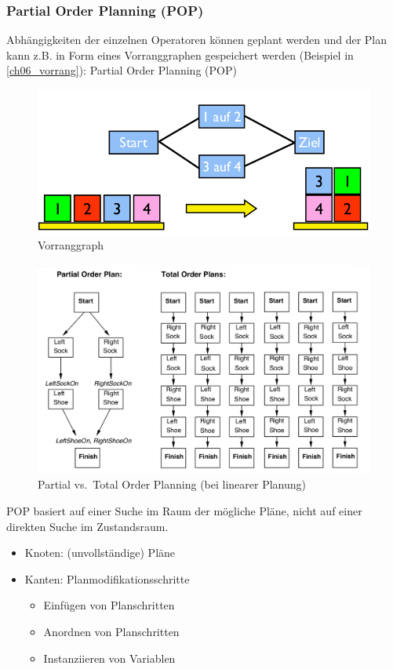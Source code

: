 \subsubsection{Partial Order Planning (POP)}
Abhängigkeiten der einzelnen Operatoren können geplant werden und der Plan kann z.B. in Form eines Vorranggraphen gespeichert werden (Beispiel in \autoref{ch06_vorrang}): Partial Order Planning (POP)
\begin{figure}[ht]\centering 
\includegraphics[width=.4\textwidth]{figures/ch06_vorrang.png}
\caption{Vorranggraph}
\label{ch06_vorrang}
\end{figure}
\begin{figure}[ht]\centering 
\includegraphics[width=\textwidth]{figures/ch06_partialOrder.png}
\caption{Partial vs.\ Total Order Planning (bei linearer Planung)}
\label{ch06_orderPlanning}
\end{figure}
POP basiert auf einer Suche im Raum der mögliche Pläne, nicht auf einer direkten Suche im Zustandsraum.
\begin{itemize}
	\item Knoten: (unvollständige) Pläne
	\item Kanten: Planmodifikationsschritte
	\begin{itemize}
		\item Einfügen von Planschritten
		\item Anordnen von Planschritten
		\item Instanziieren von Variablen
	\end{itemize}
\end{itemize}
